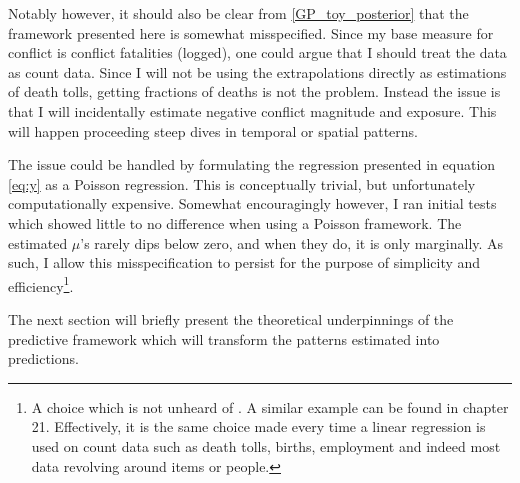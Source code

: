 \documentclass[a4paper]{article}
\begin{document}

Notably however, it should also be clear from \autoref{GP_toy_posterior} that the framework presented here is somewhat misspecified. Since my base measure for conflict is conflict fatalities (logged), one could argue that I should treat the data as count data. Since I will not be using the extrapolations directly as estimations of death tolls, getting fractions of deaths is not the problem. Instead the issue is that I will incidentally estimate negative conflict magnitude and exposure. This will happen proceeding steep dives in temporal or spatial patterns.\par

The issue could be handled by formulating the regression presented in equation \ref{eq:y} as a Poisson regression. This is conceptually trivial, but unfortunately computationally expensive. Somewhat encouragingly however, I ran initial tests which showed little to no difference when using a Poisson framework. The estimated $\mu$'s rarely dips below zero, and when they do, it is only marginally. As such, I allow this misspecification to persist for the purpose of simplicity and efficiency\footnote{A choice which is not unheard of  \cite[123]{williams2006gaussian}. A similar example can be found in \cite{Gelman_2013} chapter 21. Effectively, it is the same choice made every time a linear regression is used on count data such as death tolls, births, employment and indeed most data revolving around items or people.}.\par %


The next section will briefly present the theoretical underpinnings of the predictive framework which will transform the patterns estimated into predictions.\par 

\end{document}
